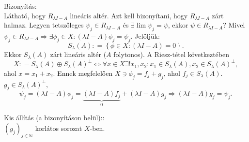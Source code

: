 \documentclass[12pt,a4paper]{scrartcl}
\newenvironment{bizonyitas}{}{}
\newenvironment{allitas}{}{}
\begin{document}
\begin{bizonyitas}

Bizonyítás:\\
Látható, hogy \(R_{\lambda I - A}\) lineáris altér. Azt kell
bizonyítani, hogy \(R_{\lambda I - A}\) zárt halmaz. Legyen tetszőleges
\(\psi_{j} \in R_{\lambda I - A}\) és \(\exists\lim\psi_{j} = \psi\),
ekkor \(\psi \in R_{\lambda I - A}\)? Mivel
\(\left. \psi_{j} \in R_{\lambda I - A}\Rightarrow\exists\phi_{j} \in X:\left( {\lambda I - A} \right)\phi_{j} = \psi_{j} \right.\).
Jelöljük:
\[S_{\lambda}\left( A \right): = \left\{ {\phi \in X:\left( {\lambda I - A} \right) = 0} \right\}.\]
Ekkor \(S_{\lambda}\left( A \right)\) zárt lineáris altér (\(A\)
folytonos). A Riesz-tétel következtében
\[\left. X: = S_{\lambda}\left( A \right) \oplus S_{\lambda}\left( A \right)^{\bot}\Leftrightarrow\forall x \in X\exists!x_{1},x_{2}:x_{1} \in S_{\lambda}\left( A \right),x_{2} \in S_{\lambda}\left( A \right)^{\bot}, \right.\]
ahol \(x = x_{1} + x_{2}\). Ennek megfelelően
\(X \ni \phi_{j} = f_{j} + g_{j}\), ahol
\(f_{j} \in S_{\lambda}\left( A \right)\).
\(g_{j} \in S_{\lambda}\left( A \right)^{\bot}\),
\[{\psi _j} = \left( {\lambda I - A} \right){\phi _j} = \underbrace {\left( {\lambda I - A} \right){f_j}}_0 + \left( {\lambda I - A} \right){g_j} \Rightarrow \left( {\lambda I - A} \right){g_j} = {\psi _j}.\]

\begin{allitas}

Kis állítás (a bizonyításon belül)::\\
\(\left( g_{j} \right)_{j \in {\mathbb{N}}}\) korlátos sorozat
\(X\)-ben.

\end{allitas}

\begin{bizonyitas}


\end{bizonyitas}
\end{bizonyitas}
\end{document}
